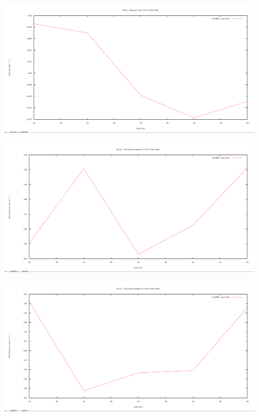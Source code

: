 \documentclass[12pt]{article}
\begin{document}
\begin{figure}[H]
	\centering
	\includegraphics[scale=	0.26]{image/apics/am_energyperbyte_vs_packetrates.png}
\end{figure}

\begin{figure}[H]
	\centering
	\includegraphics[scale=	0.26]{image/bpics/bm_energyconsumption_vs_packetrates.png}
\end{figure}

\begin{figure}[H]
	\centering
	\includegraphics[scale=	0.26]{image/apics/am_energyconsumption_vs_packetrates.png}
\end{figure}
\end{document}
